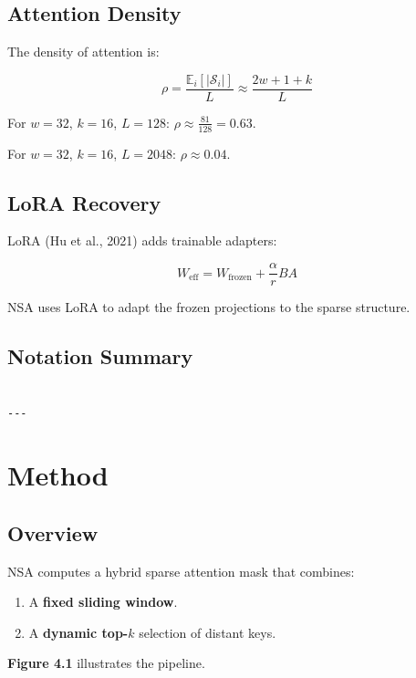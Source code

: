 \subsection{Attention Density}

The density of attention is:

\[
\rho = \frac{\mathbb{E}_i[|\mathcal{S}_i|]}{L} \approx \frac{2w + 1 + k}{L}
\tag{3.8}
\]

For $w = 32$, $k = 16$, $L = 128$: $\rho \approx \frac{81}{128} = 0.63$.

For $w = 32$, $k = 16$, $L = 2048$: $\rho \approx 0.04$.

\subsection{LoRA Recovery}

LoRA (Hu et al., 2021) adds trainable adapters:

\[
W_\text{eff} = W_\text{frozen} + \frac{\alpha}{r} B A
\tag{3.9}
\]

NSA uses LoRA to adapt the frozen projections to the sparse structure.

\subsection{Notation Summary}

\begin{lstlisting}

---
\end{lstlisting}


\section{Method}

\subsection{Overview}

NSA computes a hybrid sparse attention mask that combines:
\begin{enumerate}
\item A \textbf{fixed sliding window}.
\item A \textbf{dynamic top-$k$} selection of distant keys.

\end{enumerate}
\textbf{Figure 4.1} illustrates the pipeline.

